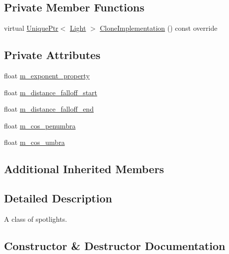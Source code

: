 \subsection*{Private Member Functions}
\begin{DoxyCompactItemize}
\item 
virtual \hyperlink{namespacemage_a8c307fbcc33bce9b7f2aa4c26c3b95cf}{Unique\+Ptr}$<$ \hyperlink{classmage_1_1_light}{Light} $>$ \hyperlink{classmage_1_1_spot_light_a060044ae1de97143878ad26524f03709}{Clone\+Implementation} () const override
\end{DoxyCompactItemize}
\subsection*{Private Attributes}
\begin{DoxyCompactItemize}
\item 
float \hyperlink{classmage_1_1_spot_light_ac1ac3c8c25760d8beb7e05c8caeaa6a3}{m\+\_\+exponent\+\_\+property}
\item 
float \hyperlink{classmage_1_1_spot_light_a96c4a4f1b77c9a6aadb82cf48248cc5d}{m\+\_\+distance\+\_\+falloff\+\_\+start}
\item 
float \hyperlink{classmage_1_1_spot_light_a8e0616e3a36d1a05d800cc4a43739178}{m\+\_\+distance\+\_\+falloff\+\_\+end}
\item 
float \hyperlink{classmage_1_1_spot_light_ac5d9f3426397abff72c5098b6e7e8472}{m\+\_\+cos\+\_\+penumbra}
\item 
float \hyperlink{classmage_1_1_spot_light_a9afab31514f93d702f9e516491f262f2}{m\+\_\+cos\+\_\+umbra}
\end{DoxyCompactItemize}
\subsection*{Additional Inherited Members}


\subsection{Detailed Description}
A class of spotlights. 

\subsection{Constructor \& Destructor Documentation}
\hypertarget{classmage_1_1_spot_light_adc5c7b5fead1b7b0c8728ffd816a9ada}{}\label{classmage_1_1_spot_light_adc5c7b5fead1b7b0c8728ffd816a9ada} 
